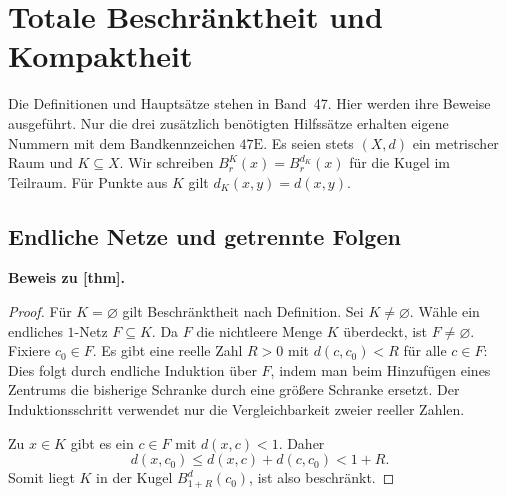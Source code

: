 \chapter{Totale Beschränktheit und Kompaktheit}
\hypertarget{compactness.proofs}{}
\noindent\CompactnessMainLink{}\enspace\textperiodcentered\enspace\CompactnessReadingLink{}
\par\medskip

Die Definitionen und Hauptsätze stehen in Band~47. Hier werden ihre Beweise
ausgeführt. Nur die drei zusätzlich benötigten Hilfssätze erhalten eigene
Nummern mit dem Bandkennzeichen \(47\mathrm E\).
Es seien stets \((X,d)\) ein metrischer Raum und \(K\subseteq X\).
Wir schreiben \(B_r^K(x)=B_r^{d_K}(x)\) für die Kugel im Teilraum.
Für Punkte aus \(K\) gilt \(d_K(x,y)=d(x,y)\).

\section{Endliche Netze und getrennte Folgen}

\noindent\textbf{Beweis zu [thm].}
\begin{proof}
Für \(K=\varnothing\) gilt Beschränktheit nach Definition. Sei
\(K\ne\varnothing\). Wähle ein endliches \(1\)-Netz \(F\subseteq K\).
Da \(F\) die nichtleere Menge \(K\) überdeckt, ist \(F\ne\varnothing\).
Fixiere \(c_0\in F\). Es gibt eine reelle Zahl \(R>0\) mit
\(d(c,c_0)<R\) für alle \(c\in F\): Dies folgt durch endliche Induktion
über \(F\), indem man beim Hinzufügen eines Zentrums die bisherige
Schranke durch eine größere Schranke ersetzt. Der Induktionsschritt
verwendet nur die Vergleichbarkeit zweier reeller Zahlen.

Zu \(x\in K\) gibt es ein \(c\in F\) mit \(d(x,c)<1\). Daher
\[
 d(x,c_0)\leq d(x,c)+d(c,c_0)<1+R.
\]
Somit liegt \(K\) in der Kugel \(B_{1+R}^d(c_0)\), ist also beschränkt.
\end{proof}

